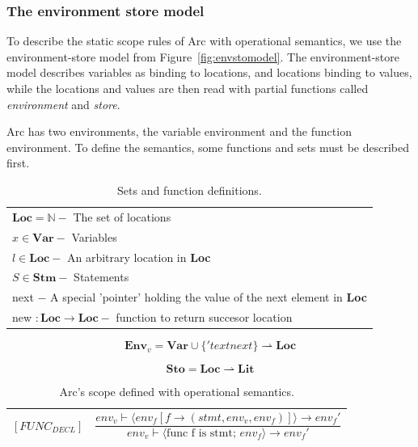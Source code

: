 \subsubsection{The environment store model}
To describe the static scope rules of Arc with operational semantics, we use the environment-store model from Figure~\ref{fig:envstomodel}. The environment-store model describes variables as binding to locations, and locations binding to values, while the locations and values are then read with partial functions called \textit{environment} and \textit{store}.

Arc has two environments, the variable environment and the function environment. To define the semantics, some functions and sets must be described first.

\begin{table}[htbp]
    \centering
    \begin{tabular}{l}
        \toprule
        $\textbf{Loc} = \mathbb{N} - $ The set of locations                                   \\
        $x \in \textbf{Var} - $ Variables                                                     \\
        $l \in \textbf{Loc} - $ An arbitrary location in \textbf{Loc}                         \\
        $S \in \textbf{Stm} - $ Statements                                                    \\
        next $- $ A special 'pointer' holding the value of the next element in \textbf{Loc}   \\
        new $: \textbf{Loc} \rightarrow \textbf{Loc} - $ function to return succesor location \\
        \bottomrule
    \end{tabular}
    \caption{Sets and function definitions.}
    \label{tab:setsandfunctions}
\end{table}


\begin{equation}\label{eq:environmentset}
    \textbf{Env}_v = \textbf{Var} \cup \{'text{next}\} \rightharpoonup \textbf{Loc}
\end{equation}

\begin{equation}\label{eq:storeset}
    \textbf{Sto} = \textbf{Loc} \rightharpoonup \textbf{Lit}
\end{equation}



\begin{table}[htbp]
    \centering
    \begin{tabular}{ll}
        \toprule
        $[FUNC_{DECL}] $ & $\dfrac
            {env_v \vdash \langle env_f[f \to (stmt, env_v, env_f)] \rangle \to env_f \prime}
            {env_v \vdash \langle \text{func f is stmt; } env_f \rangle \to env_f \prime}$ \\
        \bottomrule
    \end{tabular}
    \caption{Arc's scope defined with operational semantics.}
    \label{tab:arcscoperules}
\end{table}


